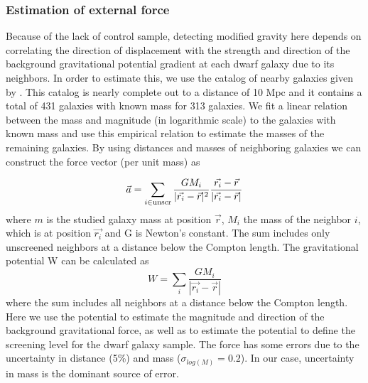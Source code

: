 \documentclass[useAMS,usenatbib,twocolumn]{mn2e}
\begin{document}
\subsubsection{Estimation of external force}
Because of the lack of control sample, detecting modified gravity here
depends on correlating the direction of displacement with the strength
and direction of the background gravitational potential gradient at
each dwarf galaxy due to its neighbors.  In order to estimate this,
we use the
catalog of  nearby galaxies given by \citet{kar04}. This catalog is nearly
complete out to a distance of 10 Mpc and it contains a total of 431 galaxies
with known mass for 313 galaxies. We fit a linear relation between the
mass and magnitude (in logarithmic scale) to the galaxies with known mass and
use this empirical relation to estimate the masses of the remaining galaxies.
By using distances and masses of neighboring galaxies we can construct the
force vector (per unit mass) as 

\begin{equation}
\vec{a} =\sum_{i \in {\rm unscr}}{\frac{G M_i}{|\vec{r_i}
-\vec{r}|^2} \frac{\vec{r_i}
-\vec{r}}{|\vec{r_i} -\vec{r}|} }
\label{eq:accelaration}
\end{equation}
where $m$ is the studied galaxy mass at position $\vec{r}$,
 $M_i$ the mass of the
neighbor $i$, which is at position $\vec{r_i}$ and G is Newton's
constant. The sum includes only unscreened neighbors at a distance below the
Compton length. 
The gravitational potential W can be calculated as 
\begin{equation}
 W=\sum_i{\frac{G M_i}{|\vec{r_i} -\vec{r}|}  }
\end{equation}
where the sum includes all neighbors at a distance below the Compton length.
Here we use the potential to estimate the magnitude and direction of the
background gravitational force, as well as to estimate the potential to
define the screening level for the dwarf galaxy sample.
The force has some errors due to the
uncertainty in distance (5\%) and mass ($\sigma_{log(M)}=0.2$).
In our case, uncertainty in mass is the
dominant source of error. 
\end{document}
